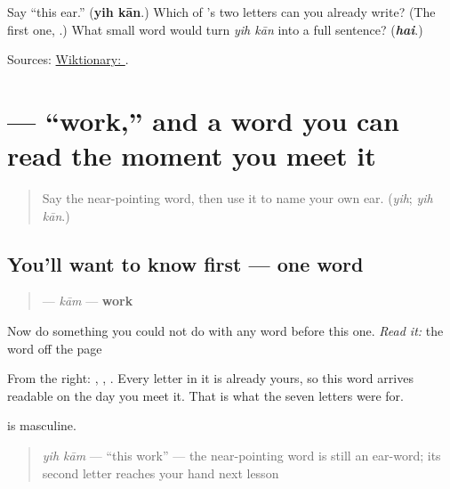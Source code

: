 \begin{tcolorbox}[breakable,colback=teal!4,colframe=teal!35!black,title={Before you move on}]
Say \textquotedblleft{}this ear.\textquotedblright{} (\textbf{yih kān}.) Which of \textbf{}'s two letters can you already write? (The first one, \textbf{}.) What small word would turn \emph{yih kān} into a full sentence? (\emph{\textbf{hai}}.)

Sources: \href{https://en.wiktionary.org/wiki/\%DB\%8C\%DB\%81}{Wiktionary: }.
\end{tcolorbox}
\section[\texorpdfstring{\ur{کام} (kām)}{کام (kām)}]{ — \textquotedblleft{}work,\textquotedblright{} and a word you can read the moment you meet it}

\label{lesson:UR-C17-kaam}



\begin{quote}
Say the near-pointing word, then use it to name your own ear. (\emph{yih}; \emph{yih kān}.)
\end{quote}

\subsection*{You'll want to know first — one word}
\begin{quote}
\textbf{} — \emph{kām} — \textbf{work}
\end{quote}

Now do something you could not do with any word before this one. \emph{Read it:} the word off the page

From the right: \textbf{}, \textbf{}, \textbf{}. Every letter in it is already yours, so this word arrives readable on the day you meet it. That is what the seven letters were for.

\textbf{} is masculine.

\begin{quote}
\emph{yih kām} — \textquotedblleft{}this work\textquotedblright{} — the near-pointing word is still an ear-word; its second letter reaches your hand next lesson
\end{quote}

